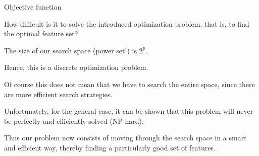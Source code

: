 \documentclass[11pt,compress,t,notes=noshow, xcolor=table]{beamer}
\begin{document}
\begin{vbframe}{Objective function}
    \begin{blocki}{How difficult is it to solve the introduced optimization problem, that is, to find the optimal feature set?}
      \item The size of our search space (power set!) is $2^p$.
      \item Hence, this is a discrete optimization problem.
      \item Of course this does not mean that we have to search the entire space, since there are more efficient search strategies.
      \item Unfortunately, for the general case, it can be shown that this problem will never be perfectly and efficiently solved (NP-hard).
      \item Thus our problem now consists of moving through the search space in a smart and efficient way, thereby finding a particularly good set of features.
    \end{blocki}
  \end{vbframe}
\end{document}
